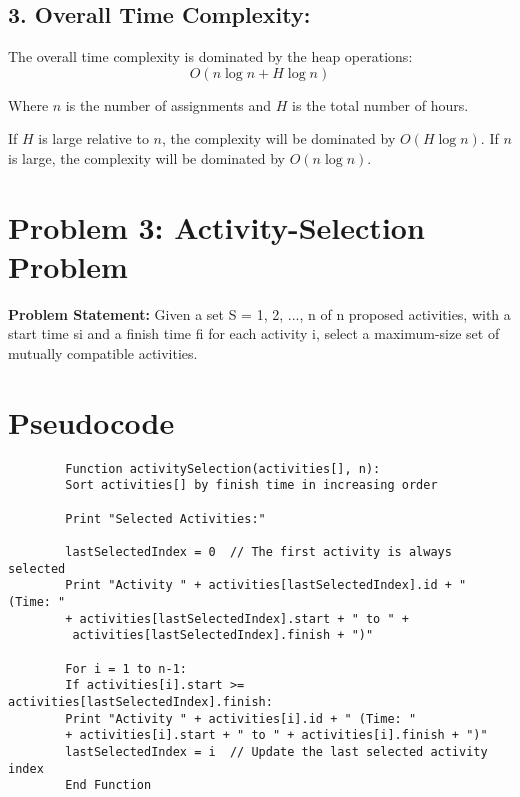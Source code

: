 \documentclass[a4paper,12pt]{report}
\begin{document}
\subsection*{3. Overall Time Complexity:}
The overall time complexity is dominated by the heap operations:
\[
O(n \log n + H \log n)
\]

Where \( n \) is the number of assignments and \( H \) is the total number of hours.

If \( H \) is large relative to \( n \), the complexity will be dominated by \( O(H \log n) \). If \( n \) is large, the complexity will be dominated by \( O(n \log n) \).

\newpage
\section*{Problem 3: Activity-Selection Problem}

\textbf{Problem Statement:}  
Given a set S = {1, 2, ..., n} of n proposed activities, with a start time si and a finish time fi for each activity i, select a maximum-size set of mutually compatible activities.

\section*{Pseudocode}

\begin{tcolorbox}[colback=white, colframe=black, boxrule=0.5pt] %
	\ttfamily\small  %
	\begin{verbatim}
		Function activitySelection(activities[], n):
		Sort activities[] by finish time in increasing order
		
		Print "Selected Activities:"
		
		lastSelectedIndex = 0  // The first activity is always selected
		Print "Activity " + activities[lastSelectedIndex].id + " (Time: " 
		+ activities[lastSelectedIndex].start + " to " + 
		 activities[lastSelectedIndex].finish + ")"
		
		For i = 1 to n-1:
		If activities[i].start >= activities[lastSelectedIndex].finish:
		Print "Activity " + activities[i].id + " (Time: " 
		+ activities[i].start + " to " + activities[i].finish + ")"
		lastSelectedIndex = i  // Update the last selected activity index
		End Function
	\end{verbatim}
\end{tcolorbox}
\end{document}
